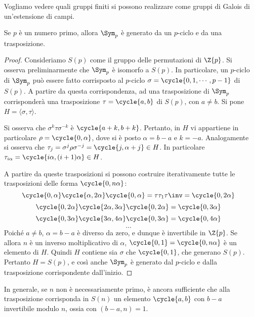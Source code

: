 \documentclass[11pt]{scrartcl}
\begin{document}
	Vogliamo vedere quali gruppi finiti si possono realizzare come gruppi di 
	Galois di un'estensione di campi. 
	
	\begin{lemma}
		\label{lemma3.18}
		Se $p$ è un numero primo, allora $\Sym_p$ è generato da un $p$-ciclo e da una trasposizione.
	\end{lemma}
	
	\begin{proof}
		Consideriamo $S(p)$ come il gruppo delle permutazioni di $\Z{p}$. Si osserva preliminarmente
		che $\Sym_p$ è isomorfo a $S(p)$. In particolare, un $p$-ciclo di $\Sym_p$ può essere fatto
		corrisposto al $p$-ciclo $\sigma = \cycle{0, 1, \cdots, p-1}$
		di $S(p)$. A partire da questa corrispondenza, ad una trasposizione di $\Sym_p$ corrisponderà
		una trasposizione $\tau = \cycle{a, b}$ di $S(p)$, con $a \neq b$. Si pone $H = \langle \sigma, \tau \rangle$. \medskip
		
		
		Si osserva che $\sigma^k \tau \sigma^{-k}$ è $\cycle{a+k, b+k}$. Pertanto, in
		$H$ vi appartiene in particolare $\rho = \cycle{0, \alpha}$, dove si è posto
		$\alpha = b-a$ e $k = -a$.
		Analogamente si osserva che $\tau_j = \sigma^j \rho \sigma^{-j} = \cycle{j, \alpha + j} \in H$. In
		particolare $\tau_{i \alpha} = \cycle{i \alpha, (i+1) \alpha} \in H$. \medskip
		
		
		A partire da queste trasposizioni si possono costruire iterativamente tutte le trasposizioni
		delle forma $\cycle{0, n\alpha}$:
		\[
		\cycle{0, \alpha}\cycle{\alpha, 2\alpha}\cycle{0, \alpha} = \tau \tau_{1} \tau\inv = \cycle{0, 2\alpha}
		\]
		\[
		\cycle{0, 2\alpha}\cycle{2\alpha, 3\alpha}\cycle{0, 2\alpha} = \cycle{0, 3\alpha}
		\]
		\[
		\cycle{0, 3\alpha}\cycle{3\alpha, 4\alpha}\cycle{0, 3\alpha} = \cycle{0, 4\alpha}
		\]
		\[ \ldots \]
		 Poiché $a \neq b$, $\alpha = b - a$ è
		diverso da zero, e dunque è invertibile in $\Z{p}$. Se allora $n$ è un inverso moltiplicativo
		di $\alpha$, $\cycle{0, 1} = \cycle{0, n \alpha}$ è un elemento di $H$.
		Quindi $H$ contiene sia $\sigma$ che $\cycle{0, 1}$, che generano $S(p)$. Pertanto $H = S(p)$,
		e così anche $\Sym_p$ è generato dal $p$-ciclo e dalla trasposizione corrispondente dall'inizio.
	\end{proof}
	
	\begin{remark}
		In generale, se $n$ non è necessariamente primo, è ancora sufficiente che alla trasposizione
		corrisponda in $S(n)$ un elemento $\cycle{a, b}$ con $b-a$ invertibile modulo $n$, ossia
		con $(b-a, n) = 1$. 
	\end{remark}
	
\end{document}
